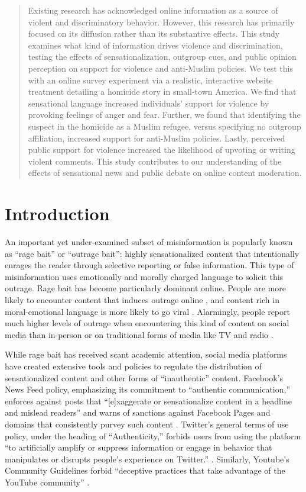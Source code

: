 \begin{abstract}
\noindent Existing research has acknowledged online information as a source of violent and discriminatory behavior. However, this research has primarily focused on its diffusion rather than its substantive effects. This study examines what kind of information drives violence and discrimination, testing the effects of sensationalization, outgroup cues, and public opinion perception on support for violence and anti-Muslim policies. We test this with an online survey experiment via a realistic, interactive website treatment detailing a homicide story in small-town America. We find that sensational language increased individuals' support for violence by provoking feelings of anger and fear. Further, we found that identifying the suspect in the homicide as a Muslim refugee, versus specifying no outgroup affiliation, increased support for anti-Muslim policies. Lastly, perceived public support for violence increased the likelihood of upvoting or writing violent comments. This study contributes to our understanding of the effects of sensational news and public debate on online content moderation.
\end{abstract}

\section{Introduction}

An important yet under-examined subset of misinformation is popularly known as ``rage bait'' or ``outrage bait'': highly sensationalized content that intentionally enrages the reader through selective reporting or false information. This type of misinformation uses emotionally and morally charged language to solicit this outrage. Rage bait has become particularly dominant online. People are more likely to encounter content that induces outrage online \citep{crockett2017moral}, and content rich in moral-emotional language is more likely to go viral \citep{brady2017emotion, fan2014anger}. Alarmingly, people report much higher levels of outrage when encountering this kind of content on social media than in-person or on traditional forms of media like TV and radio \citep{crockett2017moral}.

While rage bait has received scant academic attention, social media platforms have created extensive tools and policies to regulate the distribution of sensationalized content and other forms of ``inauthentic'' content. Facebook's News Feed policy, emphasizing its commitment to ``authentic communication,'' enforces against posts that ``[e]xaggerate or sensationalize content in a headline and mislead readers'' and warns of sanctions against Facebook Pages and domains that consistently purvey such content \citep{facebook2021}. Twitter's general terms of use policy, under the heading of ``Authenticity,'' forbids users from using the platform ``to artificially amplify or suppress information or engage in behavior that manipulates or disrupts people’s experience on Twitter.'' \citep{twitter2021}. Similarly, Youtube's Community Guidelines forbid ``deceptive practices that take advantage of the YouTube community'' \citep{youtube2021}. 

